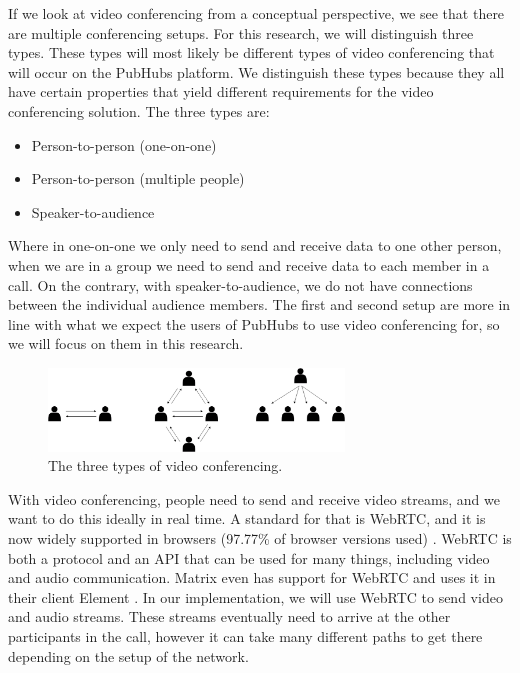 \documentclass{report}
\begin{document}
If we look at video conferencing from a conceptual perspective, we see that there are multiple conferencing setups.
For this research, we will distinguish three types. These types will most likely be different types of video
conferencing that will occur on the PubHubs platform. We distinguish these types because
they all have certain properties that yield different requirements for the video conferencing solution. The three
types are:

\begin{itemize}
    \item Person-to-person (one-on-one)
    \item Person-to-person (multiple people)
    \item Speaker-to-audience
\end{itemize}

Where in one-on-one we only need to send and receive data to one other person, when we are in a
group we need to send and receive data to each member in a call. On the contrary, with speaker-to-audience, we do
not have connections between the individual audience members. The first and second setup are more in line with what
we expect the users of PubHubs to use video conferencing for, so we will focus on them in this research.

\begin{figure}[!hbt]
\centering
\includegraphics[width=0.7\textwidth]{img/three-types}
\caption{The three types of video conferencing.}
\label{fig:three-types-video-conferencing}
\end{figure}

With video conferencing, people need to send and receive video streams, and we want to do this ideally in real time.
A standard for that is WebRTC, and it is now widely supported in browsers (97.77\% of browser versions used) \cite{
noauthor_webrtc_nodate}. WebRTC is both a protocol and an API that can be used for many things, including video and audio communication.
Matrix even has support for WebRTC and uses it in their client Element \cite{noauthor_element_nodate}. In our
implementation, we will use WebRTC to send video and audio streams. These streams eventually need to arrive at
the other participants in the call, however it can take many different paths to get there depending on the setup of
the network.
\end{document}

